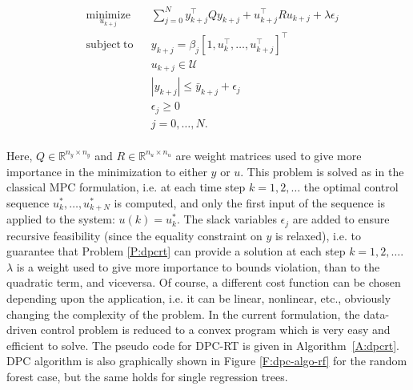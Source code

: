 \begin{problem}\label{P:dpcrt}
	\begin{equation}
	\begin{aligned}
	& \underset{u_{k+j}}{\mathrm{minimize}} & & \sum_{j=0}^{N} y^\top_{k+j} Q y_{k+j} + u^\top_{k+j} R u_{k+j} + \lambda\epsilon_j \\
	& \mathrm{subject\ to }                 & & y_{k+j}     =   \beta_j [1,u^\top_{k},\ldots,u^\top_{k+j} ]^\top                   \\
	&                                       & & u_{k+j}    \in  \mathcal{U}                                                        \\
	&                                       & & |y_{k+j}|  \leq \bar{y}_{k+j} + \epsilon_j 										   \\
	&                                       & & \epsilon_j \geq  0							                                       \\
	&                                       & & j           =    0,\ldots,N.            									       \\
	\end{aligned}
	\label{E:dpcrt}
	\end{equation}
\end{problem}

\textcolor[rgb]{0,0,1}{Here, $Q \in \mathbb{R}^{n_y\times n_y}$ and $R \in \mathbb{R}^{n_u\times n_u}$ are weight matrices used to give more importance in the minimization to either $y$ or $u$.
This problem is solved as in the classical MPC formulation, i.e. at each time step $k=1,2,\ldots$ the optimal control sequence $u^*_k,\ldots,u^*_{k+N}$ is computed, and only the first input of the sequence is applied to the system: $u(k) = u^*_k$.
The slack variables $\epsilon_j$ are added to ensure recursive feasibility (since the equality constraint on $y$ is relaxed), i.e. to guarantee that Problem \ref{P:dpcrt} can provide a solution at each step $k=1,2,\ldots$.
$\lambda$ is a weight used to give more importance to bounds violation, than to the quadratic term, and viceversa. 
Of course, a different cost function can be chosen depending upon the application, i.e. it can be linear, nonlinear, etc., obviously changing the complexity of the problem.
In the current formulation, the data-driven control problem is reduced to a convex program which is very easy and efficient to solve.}
The pseudo code for DPC-RT is given in Algorithm~\ref{A:dpcrt}.
\textcolor[rgb]{0,0,1}{DPC algorithm is also graphically shown in Figure \ref{F:dpc-algo-rf} for the random forest case, but the same holds for single regression trees.}

